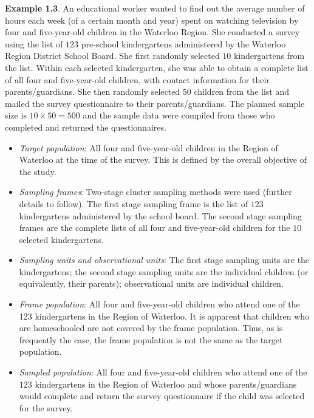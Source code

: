 \documentclass[oneside]{book}\usepackage[]{graphicx}\usepackage[svgnames]{xcolor}
\begin{document}
\begin{Example}{}
      \textbf{Example 1.3}. An educational worker wanted to find out the average
      number of hours each week (of a certain month and year) spent on
      watching television by four and five-year-old children in the Waterloo
      Region. She conducted a survey using the list of $123$ pre-school
      kindergartens administered by the Waterloo Region District School
      Board. She first randomly selected $10$ kindergartens from the list.
      Within each selected kindergarten, she was able to obtain a complete
      list of all four and five-year-old children, with contact information for
      their parents/guardians. She then randomly selected $50$ children from
      the list and mailed the survey questionnaire to their parents/guardians.
      The planned sample size is $ 10\times 50=500 $ and the sample data were
      compiled from those who completed and returned the questionnaires.
      \tcblower{}
      \begin{itemize}
            \item \emph{Target population}:
                  All four and five-year-old children in the Region of Waterloo at
                  the time of the survey. This is defined by the overall objective of
                  the study.
            \item \emph{Sampling frames}: Two-stage cluster sampling methods were used (further details to
                  follow). The first stage sampling frame is the list of $123$
                  kindergartens administered by the school board. The second
                  stage sampling frames are the complete lists of all four and five-year-old
                  children for the $10$ selected kindergartens.
            \item \emph{Sampling units and observational units}: The first stage sampling units are the kindergartens; the second
                  stage sampling units are the individual children (or equivalently,
                  their parents); observational units are individual children.
            \item \emph{Frame population}: All four and five-year-old children who attend one of the 123
                  kindergartens in the Region of Waterloo. It is apparent that
                  children who are homeschooled are not covered by the frame
                  population. Thus, as is frequently the case, the frame population
                  is not the same as the target population.
            \item \emph{Sampled population}: All four and
                  five-year-old children who attend one of the $123$
                  kindergartens in the Region of Waterloo and whose
                  parents/guardians would complete and return the survey
                  questionnaire if the child was selected for the survey.
      \end{itemize}
\end{Example}
\end{document}
